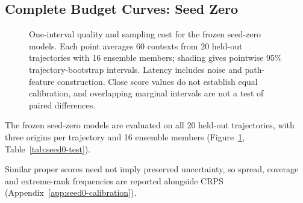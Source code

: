 \subsection{Complete Budget Curves: Seed Zero}
\begin{figure}[t]
\centering
{}
\caption{One-interval quality and sampling cost for the frozen seed-zero models. Each point averages 60 contexts from 20 held-out trajectories with 16 ensemble members; shading gives pointwise 95\% trajectory-bootstrap intervals. Latency includes noise and path-feature construction. Close score values do not establish equal calibration, and overlapping marginal intervals are not a test of paired differences.}
\label{fig:quality-cost}
\end{figure}
\begin{table}[t]
\caption{Seed-zero one-interval test measurements: 20 held-out trajectories, three origins each, and 16 ensemble members. Student checkpoints are selected before testing. Values average the 60 contexts.}
\label{tab:seed0-test}
\centering
{}
\end{table}
The frozen seed-zero models are evaluated on all 20 held-out trajectories, with three origins per trajectory and 16 ensemble members (Figure~\ref{fig:quality-cost}, Table~\ref{tab:seed0-test}). 

Similar proper scores need not imply preserved uncertainty, so spread, coverage and extreme-rank frequencies are reported alongside CRPS (Appendix~\ref{app:seed0-calibration}). 


